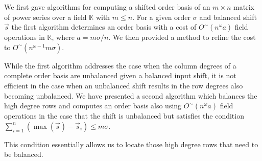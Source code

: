 We first gave algorithms for computing a shifted order basis of an
$m\times n$ matrix of power series over a field $\mathbb{K}$ with
$m\le n$. For a given order $\sigma$ and balanced shift $\vec{s}$
the first algorithm determines an order basis with a cost of $O^{\sim}(n^{\omega}a)$
field operations in $\mathbb{K}$, where $a=m\sigma/n.$ We then provided
a method to refine the cost to $O^{\sim}(n^{\omega-1}m\sigma)$. %
\begin{comment}
This extends earlier work of Storjohann which only determines a subset
of an order basis that is within a specified degree bound $\delta$
using $O^{\sim}(n^{\omega}\delta)$ field operations for $\delta\ge\lceil m\sigma/n\rceil$.
\end{comment}
{} While the first algorithm addresses the case when the column degrees
of a complete order basis are unbalanced given a balanced input shift,
it is not efficient in the case when an unbalanced shift results in
the row degrees also becoming unbalanced. %
We have presented a second algorithm which balances the high degree
rows and computes an order basis also using $O^{\sim}(n^{\omega}a)$
field operations in the case that the shift is unbalanced but satisfies
the condition $\sum_{i=1}^{n}(\max(\vec{s})-\vec{s}_{i})\le m\sigma$.%
\begin{comment}
Every problem with any unbalanced shift can be in fact reduced to
a problem with a shift that satisfying this condition if the degrees
of a resulting order basis is known. 
\end{comment}
{} %
\begin{comment}
Many unbalanced shift problems can be in fact converted to problems
satisfying this condition. 
\end{comment}
{} This condition essentially allows us to locate those high degree
rows that need to be balanced. %
\begin{comment}
In more general unbalanced shift cases, this algorithm may not work
well directly since we do not know in advance which are the high degree
rows need to be balanced. But it may work efficiently if we have an
effective way of estimating the resulting row degrees. 
\end{comment}
{} %
\begin{comment}
This extends the earlier work by the authors from ISSAC'09.
\end{comment}


